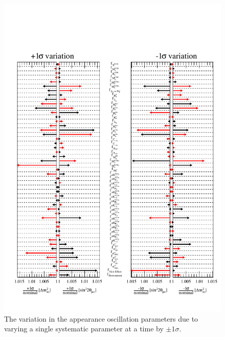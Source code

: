 \begin{figure}[h!]
    \centering
    \includegraphics[width = \textwidth]{figures-chap6/star_plot/nue_app_pulls_2.pdf}
    \caption[\nue appearance oscillation parameter pulls due to varying a single systematic parameter by $\pm1\sigma$.]{The variation in the \nue appearance oscillation parameters due to varying a single systematic parameter at a time by $\pm1\sigma$.}
    \label{fig:nue_app_osc_param_pulls}
\end{figure}

